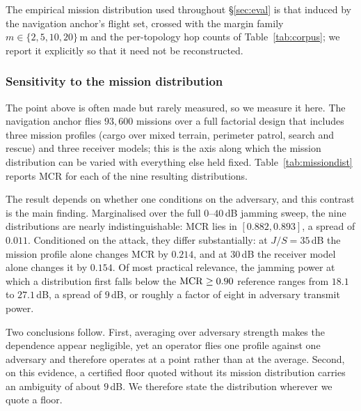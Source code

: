 The empirical mission distribution used throughout \S\ref{sec:eval} is that
induced by the navigation anchor's flight set, crossed with the margin family
$m\in\{2,5,10,20\}$\,m and the per-topology hop counts of
Table~\ref{tab:corpus}; we report it explicitly so that it need not be
reconstructed.

\subsubsection*{Sensitivity to the mission distribution}
\label{sec:missiondist}
The point above is often made but rarely measured, so we measure it here. The
navigation anchor flies $93{,}600$ missions over a full factorial design that
includes three mission profiles (cargo over mixed terrain, perimeter patrol,
search and rescue) and three receiver models; this is the axis along which the
mission distribution can be varied with everything else held fixed.
Table~\ref{tab:missiondist} reports MCR for each of the nine resulting
distributions.

The result depends on whether one conditions on the adversary, and this contrast
is the main finding. Marginalised over the full $0$--$40$\,dB jamming sweep, the
nine distributions are nearly indistinguishable: MCR lies in $[0.882,0.893]$, a
spread of $0.011$. Conditioned on the attack, they differ substantially: at
$J/S=35$\,dB the mission profile alone changes MCR by $0.214$, and at $30$\,dB
the receiver model alone changes it by $0.154$. Of most practical relevance, the
jamming power at which a distribution first falls below the $\mathrm{MCR}\ge0.90$
reference ranges from $18.1$ to $27.1$\,dB, a spread of $9$\,dB, or roughly a
factor of eight in adversary transmit power.

Two conclusions follow. First, averaging over adversary strength makes the
dependence appear negligible, yet an operator flies one profile against one
adversary and therefore operates at a point rather than at the average. Second,
on this evidence, a certified floor quoted without its mission distribution
carries an ambiguity of about $9$\,dB. We therefore state the distribution
wherever we quote a floor.

\begin{table}[t]
\centering
\caption{MCR under the composed defence for each of nine mission distributions,
marginalised over the $0$--$40$\,dB jamming sweep, with Wilson $95\%$ intervals.
The marginal spread is small; the spread conditional on attack strength
reaches $0.214$, and the $J/S$ at which MCR crosses $0.90$ spans $9$\,dB.
Provenance: simulation (physics-informed). Generated by
.}
\label{tab:missiondist}
\scriptsize
\renewcommand{\arraystretch}{1.02}

\end{table}

